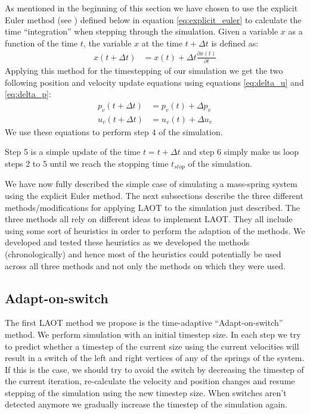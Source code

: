 \documentclass[11pt]{article}
\begin{document}
As mentioned in the beginning of this section we have chosen to use the
explicit Euler method (see \cite{Flaherty}) defined below in equation \ref{eq:explicit_euler}
to calculate the time ``integration'' when stepping through
the simulation. Given a variable $x$ as a function of the time $t$, the
variable $x$ at the time $t + \Delta t$ is defined as:
\begin{align}
    \label{eq:explicit_euler}
    x(t+\Delta t) &= x(t) + \Delta t \frac{\partial x(t)}{\partial t}
\end{align}
Applying this method for the timestepping of our simulation we get the
two following position and velocity update equations using equations
\ref{eq:delta_u} and \ref{eq:delta_p}:
\begin{align*}
    p_v(t+\Delta t) &= p_v(t) + \Delta p_v \\
    u_v(t+\Delta t) &= u_v(t) + \Delta u_v
\end{align*}
We use these equations to perform step 4 of the simulation.

Step 5 is a simple update of the time $t = t + \Delta t$ and step 6 simply make
us loop steps 2 to 5 until we reach the stopping time $t_{stop}$ of the
simulation.

We have now fully described the simple case of simulating a mass-spring system
using the explicit Euler method. The next subsections describe the three
different methods/modifications for applying LAOT to the simulation just
described. The three methods all rely on different ideas to implement LAOT. They
all include using some sort of heuristics in order to perform the adaption of
the methods. We developed and tested these heuristics as we developed the
methods (chronologically) and hence most of the heuristics could potentially be
used across all three methods and not only the methods on which they were used.

\subsection{Adapt-on-switch}
\label{sec:method_switch}
The first LAOT method we propose is the time-adaptive ``Adapt-on-switch''
method. We perform simulation with an initial timestep size. In each step
we try to predict whether a timestep of the current size using the current
velocities will result in a switch of the left and right vertices of any
of the springs of the system. If this is the case, we should try to avoid the switch by
decreasing the timestep of the current iteration, re-calculate the velocity
and position changes and resume stepping of the simulation using the new
timestep size. When switches aren't detected anymore we gradually increase the
timestep of the simulation again.
\end{document}
